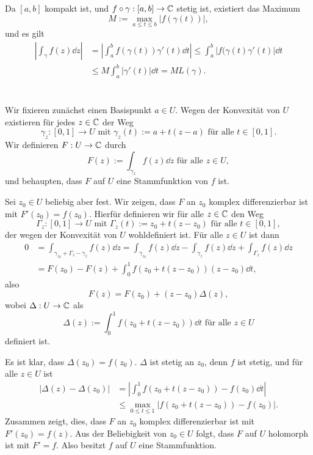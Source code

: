 \documentclass[a4paper,10pt]{article}
\begin{document}
\section{}
Da $[a,b]$ kompakt ist, und $f \circ \gamma : [a,b] \to \mathbb{C}$ stetig ist, existiert das Maximum
\[
 M := \max_{a \leq t \leq b} |f(\gamma(t))|,
\]
und es gilt
\begin{align*}
 \left| \int_\gamma f(z) \dd{z} \right|
 &= \left| \int_a^b f(\gamma(t)) \gamma'(t) \dd{t} \right|
 \leq \int_a^b |f(\gamma(t) \gamma'(t) | \dd{t} \\
 &\leq M \int_a^b |\gamma'(t)| \dd{t}
 = M L(\gamma).
\end{align*}





\section{}
Wir fixieren zunächst einen Basispunkt $a \in U$. Wegen der Konvexität von $U$ existieren für jedes $z \in \mathbb{C}$ der Weg
\[
 \gamma_z : [0,1] \to U \text{ mit } \gamma_z(t) := a + t(z-a) \text{ für alle } t \in [0,1].
\]
Wir definieren $F : U \to \mathbb{C}$ durch
\[
 F(z) := \int_{\gamma_z} f(z) \dd{z} \text{ für alle } z \in U,
\]
und behaupten, dass $F$ auf $U$ eine Stammfunktion von $f$ ist.

Sei $z_0 \in U$ beliebig aber fest. Wir zeigen, dass $F$ an $z_0$ komplex differenzierbar ist mit $F'(z_0) = f(z_0)$. Hierfür definieren wir für alle $z \in \mathbb{C}$ den Weg
\[
 \Gamma_z : [0,1] \to U \text{ mit } \Gamma_z(t) := z_0 + t(z-z_0) \text{ für alle } t \in [0,1],
\]
der wegen der Konvexität von $U$ wohldefiniert ist. Für alle $z \in U$ ist dann
\begin{align*}
 0
 &= \int_{\gamma_{z_0} + \Gamma_z - \gamma_z} f(z) \dd{z}
 = \int_{\gamma_{z_0}} f(z) \dd{z} - \int_{\gamma_z} f(z) \dd{z} + \int_{\Gamma_z} f(z) \dd{z} \\
 &= F(z_0) - F(z) + \int_0^1 f(z_0 + t(z-z_0))(z-z_0) \dd{t},
\end{align*}
also
\[
 F(z) = F(z_0) + (z-z_0) \Delta(z),
\]
wobei $\Delta : U \to \mathbb{C}$ als
\[
 \Delta(z) := \int_0^1 f(z_0 + t(z-z_0)) \dd{t} \text{ für alle } z \in U
\]
definiert ist.

Es ist klar, dass $\Delta(z_0) = f(z_0)$. $\Delta$ ist stetig an $z_0$, denn $f$ ist stetig, und für alle $z \in U$ ist
\begin{align*}
 |\Delta(z)-\Delta(z_0)|
 &= \left| \int_0^1 f(z_0+t(z-z_0)) - f(z_0) \dd{t} \right| \\
 &\leq \max_{0 \leq t \leq 1} |f(z_0+t(z-z_0))-f(z_0)|.
\end{align*}
Zusammen zeigt, dies, dass $F$ an $z_0$ komplex differenzierbar ist mit $F'(z_0) = f(z)$. Aus der Beliebigkeit von $z_0 \in U$ folgt, dass $F$ auf $U$ holomorph ist mit $F' = f$. Also besitzt $f$ auf $U$ eine Stammfunktion.
\end{document}
